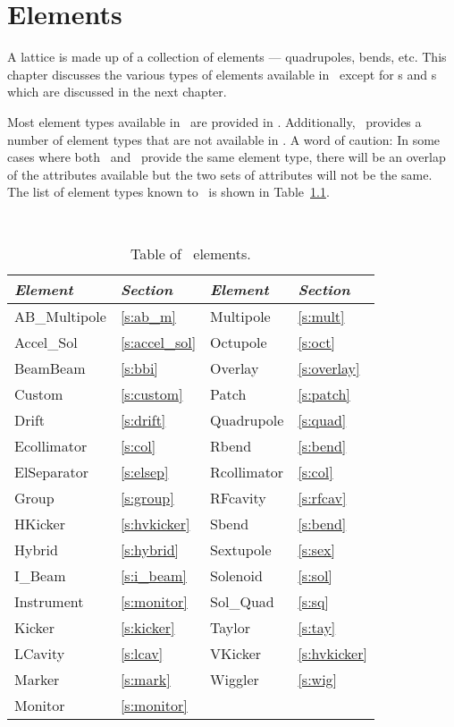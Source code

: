 \chapter{Elements}
\label{c:elements}

A lattice is made up of a collection of
elements --- quadrupoles, bends, etc. This chapter discusses the
various types of elements available in \bmad\ except for s
and s which are discussed in the next chapter.

Most element types available in \mad\ are provided in \bmad.
Additionally, \bmad\ provides a number of element types that are not
available in \mad.  A word of caution: In some cases where both \mad\
and \bmad\ provide the same element type, there will be an overlap of 
the attributes available but the two sets of attributes will not be the same.
The list of element types known to \bmad\ is shown in Table~\ref{t:elements}.

\begin{table}[h]
\centering
{\tt
\begin{tabular}{|l|l||l|l|} \hline
  {\it Element} & {\it Section}     & {\it Element} & {\it Section}    \\ \hline
  AB\_Multipole & \ref{s:ab_m}      &  Multipole    & \ref{s:mult}     \\ \hline
  Accel\_Sol    & \ref{s:accel_sol} &  Octupole     & \ref{s:oct}      \\ \hline
  BeamBeam      & \ref{s:bbi}       &  Overlay      & \ref{s:overlay}  \\ \hline
  Custom        & \ref{s:custom}    &  Patch        & \ref{s:patch}    \\ \hline
  Drift         & \ref{s:drift}     &  Quadrupole   & \ref{s:quad}     \\ \hline
  Ecollimator   & \ref{s:col}       &  Rbend        & \ref{s:bend}     \\ \hline
  ElSeparator   & \ref{s:elsep}     &  Rcollimator  & \ref{s:col}      \\ \hline
  Group         & \ref{s:group}     &  RFcavity     & \ref{s:rfcav}    \\ \hline
  HKicker       & \ref{s:hvkicker}  &  Sbend        & \ref{s:bend}     \\ \hline
  Hybrid        & \ref{s:hybrid}    &  Sextupole    & \ref{s:sex}      \\ \hline
  I\_Beam       & \ref{s:i_beam}    &  Solenoid     & \ref{s:sol}      \\ \hline
  Instrument    & \ref{s:monitor}   &  Sol\_Quad    & \ref{s:sq}       \\ \hline
  Kicker        & \ref{s:kicker}    &  Taylor       & \ref{s:tay}      \\ \hline
  LCavity       & \ref{s:lcav}      &  VKicker      & \ref{s:hvkicker} \\ \hline
  Marker        & \ref{s:mark}      &  Wiggler      & \ref{s:wig}      \\ \hline
  Monitor       & \ref{s:monitor}   &               &                  \\ \hline
\end{tabular}
}
\caption{Table of \bmad\ elements.}
\label{t:elements}\center
\end{table}


